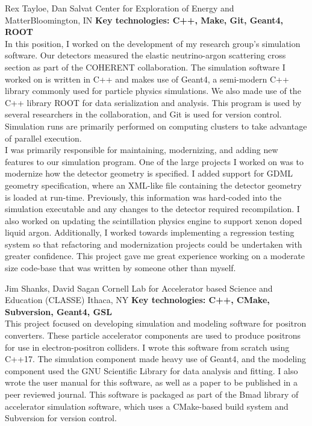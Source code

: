 \documentclass[11pt,a4paper,sans]{moderncv}        %
\newcommand{\techlist}[1]{\textbf{Key technologies: {#1}}\\}
\begin{document}
{Rex Tayloe, Dan Salvat}
{Center for Exploration of Energy and Matter}{Bloomington, IN}{
\techlist{C++, Make, Git, Geant4, ROOT}
In this position, I worked on the development of my research group's simulation software.
Our detectors measured the elastic neutrino-argon scattering cross section as part of the COHERENT collaboration.
The simulation software I worked on is written in C++ and makes use of Geant4, a semi-modern C++ library commonly used for particle physics simulations.
We also made use of the C++ library ROOT for data serialization and analysis.
This program is used by several researchers in the collaboration, and Git is used for version control.
Simulation runs are primarily performed on computing clusters to take advantage of parallel execution.
\\
I was primarily responsible for maintaining, modernizing, and adding new features to our simulation program.
One of the large projects I worked on was to modernize how the detector geometry is specified.
I added support for GDML geometry specification, where an XML-like file containing the detector geometry is loaded at run-time.
Previously, this information was hard-coded into the simulation executable and any changes to the detector required recompilation.
I also worked on updating the scintillation physics engine to support xenon doped liquid argon.
Additionally, I worked towards implementing a regression testing system so that refactoring and modernization projects could be undertaken with greater confidence.
This project gave me great experience working on a moderate size code-base that was written by someone other than myself.
}%

{Jim Shanks, David Sagan}
{Cornell Lab for Accelerator based Science and Education (CLASSE)}
{Ithaca, NY}{
\techlist{C++, CMake, Subversion, Geant4, GSL}
This project focused on developing simulation and modeling software for positron converters.
These particle accelerator components are used to produce positrons for use in electron-positron colliders.
I wrote this software from scratch using C++17.
The simulation component made heavy use of Geant4, and the modeling component used the GNU Scientific Library for data analysis and fitting.
I also wrote the user manual for this software, as well as a paper to be published in a peer reviewed journal.
This software is packaged as part of the Bmad library of accelerator simulation software, which uses a CMake-based build system and Subversion for version control.
}%
\end{document}
